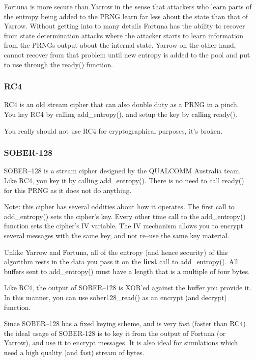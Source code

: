 \documentclass[synpaper]{book}
\begin{document}
Fortuna is more secure than Yarrow in the sense that attackers who learn parts of the entropy being
added to the PRNG learn far less about the state than that of Yarrow.  Without getting into to many
details Fortuna has the ability to recover from state determination attacks where the attacker starts
to learn information from the PRNGs output about the internal state.  Yarrow on the other hand, cannot
recover from that problem until new entropy is added to the pool and put to use through the ready() function.

\subsubsection{RC4}

RC4 is an old stream cipher that can also double duty as a PRNG in a pinch.  You key RC4 by
calling add\_entropy(), and setup the key by calling ready().

You really should not use RC4 for cryptographical purposes, it's broken.

\subsubsection{SOBER-128}

SOBER--128 is a stream cipher designed by the QUALCOMM Australia team.  Like RC4, you key it by
calling add\_entropy().  There is no need to call ready() for this PRNG as it does not do anything.

Note: this cipher has several oddities about how it operates.  The first call to add\_entropy() sets the cipher's key.
Every other time call to the add\_entropy() function sets the cipher's IV variable.  The IV mechanism allows you to
encrypt several messages with the same key, and not re--use the same key material.

Unlike Yarrow and Fortuna, all of the entropy (and hence security) of this algorithm rests in the data
you pass it on the \textbf{first} call to add\_entropy().  All buffers sent to add\_entropy() must have a length
that is a multiple of four bytes.

Like RC4, the output of SOBER--128 is XOR'ed against the buffer you provide it.  In this manner, you can use
sober128\_read() as an encrypt (and decrypt) function.

Since SOBER--128 has a fixed keying scheme, and is very fast (faster than RC4) the ideal usage of SOBER-128 is to
key it from the output of Fortuna (or Yarrow), and use it to encrypt messages.  It is also ideal for
simulations which need a high quality (and fast) stream of bytes.
\end{document}
